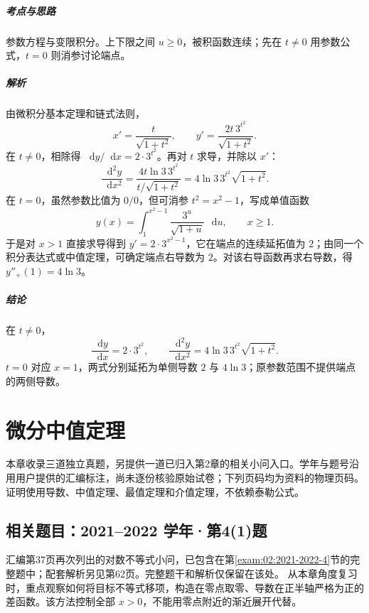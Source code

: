 \documentclass[UTF8,fontset=fandol,12pt,oneside,openany]{ctexrep}
\newcommand{\dd}{\mathop{}\!\mathrm d}
\theoremstyle{definition}
\begin{document}
\paragraph{考点与思路}参数方程与变限积分。上下限之间 $u\ge0$，被积函数连续；先在 $t\ne0$ 用参数公式，$t=0$ 则消参讨论端点。
\paragraph{解析}由微积分基本定理和链式法则，
\[
 x'=\frac t{\sqrt{1+t^2}},\qquad
 y'=\frac{2t\,3^{t^2}}{\sqrt{1+t^2}}.
\]
在 $t\ne0$，相除得 $\dd y/\dd x=2\cdot3^{t^2}$。再对 $t$ 求导，并除以 $x'$：
\[
 \frac{\dd^2y}{\dd x^2}
 =\frac{4t\ln3\,3^{t^2}}{t/\sqrt{1+t^2}}
 =4\ln3\,3^{t^2}\sqrt{1+t^2}.
\]
在 $t=0$，虽然参数比值为 $0/0$，但可消参 $t^2=x^2-1$，写成单值函数
\[
 y(x)=\int_1^{x^2-1}\frac{3^u}{\sqrt{1+u}}\,\dd u,
 \qquad x\ge1.
\]
于是对 $x>1$ 直接求导得到 $y'=2\cdot3^{x^2-1}$，它在端点的连续延拓值为 $2$；由同一个积分表达式或中值定理，可确定端点右导数为 $2$。对该右导函数再求右导数，得 $y''_+(1)=4\ln3$。
\paragraph{结论}在 $t\ne0$，
\[
 \frac{\dd y}{\dd x}=2\cdot3^{t^2},\qquad
 \frac{\dd^2y}{\dd x^2}=4\ln3\,3^{t^2}\sqrt{1+t^2}.
\]
$t=0$ 对应 $x=1$，两式分别延拓为单侧导数 $2$ 与 $4\ln3$；原参数范围不提供端点的两侧导数。


\chapter{微分中值定理}
\label{exam:06:chapter}
本章收录三道独立真题，另提供一道已归入第2章的相关小问入口。学年与题号沿用用户提供的汇编标注，尚未逐份核验原始试卷；下列页码均为资料的物理页码。证明使用导数、中值定理、最值定理和介值定理，不依赖泰勒公式。

\section*{相关题目：2021--2022 学年·第4(1)题}
汇编第37页再次列出的对数不等式小问，已包含在第\ref{exam:02:2021-2022-4}节的完整题中；配套解析另见第62页。完整题干和解析仅保留在该处。
从本章角度复习时，重点观察如何将目标不等式移项，构造在零点取零、导数在正半轴严格为正的差函数。该方法控制全部 $x>0$，不能用零点附近的渐近展开代替。
\end{document}
